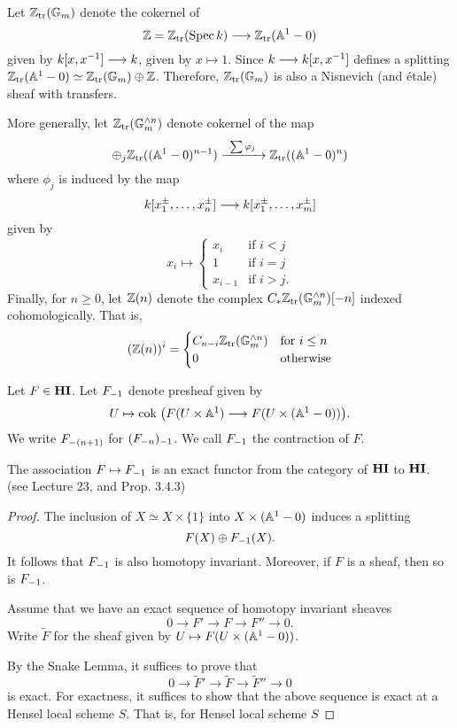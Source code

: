\begin{defn}\label{def_z_n}
Let $\Ztr(\Gm)$ denote the cokernel of
\[
\Z = \Ztr(\Spec \basefield) \to \Ztr(\A^1 - 0)
\]
given by $\basefield [x, x^{-1}] \to \basefield$, given by
$x \mapsto 1$. Since $\basefield \to \basefield[x, x^{-1}]$
defines a splitting $\Ztr(\A^1 - 0) \simeq \Ztr(\Gm) \oplus \Z$.
Therefore, $\Ztr(\Gm)$ is also a Nisnevich (and \'etale) sheaf 
with transfers. 

More generally, let $\Ztr(\Gmn{n})$ denote cokernel of the map 
\[
\oplus_j \Ztr((\A^1 - 0)^{n - 1}) \xrightarrow{\;\;\sum \phi_j\;\;}
\Ztr((\A^1 - 0)^n)
\]
where $\phi_j$ is induced by the map
\[
\basefield[x_1^{\pm},\dots,x_n^{\pm}] \to \basefield[x_1^{\pm},
\dots, x_m^{\pm}]
\]
given by
\[
x_i \mapsto
\begin{cases}
x_i &\textrm{if } i < j \\
1   &\textrm{if } i = j \\
x_{i - 1} &\textrm{if } i > j.
\end{cases}
\]
Finally, for $n \geq 0$, let $\Z(n)$ denote the complex $\suslC 
\Ztr(\Gmn{n})[-n]$ indexed cohomologically. That is, 
\[
(\Z(n))^i = \begin{cases}
\suslC[n - i]\Ztr(\Gmn{n}) & \textrm{for }i \leq n \\
0 & \textrm{otherwise}
\end{cases}
\]
\end{defn}


\begin{defn}
Let $F \in \HI$. Let $\RHI{F}$ denote presheaf given by
\[
U \mapsto \cok\big( F(U \times \A^1) \to 
   F(U \times (\A^1 - 0))\big).
\]
We write $\RHI[(n + 1)]{F}$ for $\RHI{(\RHI[n]{F})}$. We call 
$\RHI{F}$ the contraction of $F$.
\end{defn}

\begin{prop}\label{prop_contract_is_exact}
The association $F \mapsto \RHI{F}$ is an exact functor from
the category of $\HI$ to $\HI$. (see \cite{MVW} Lecture 23, and
\cite{DegGenMot} Prop. 3.4.3)
\end{prop}

\begin{proof}
The inclusion of $X \simeq X \times \{1\}$ into $X \times 
(\A^1 - 0)$ induces a splitting
\[
F(X) \oplus \RHI{F}(X).
\]
It follows that $\RHI{F}$ is also homotopy invariant. Moreover,
if $F$ is a sheaf, then so is $\RHI{F}$.

Assume that we have an exact sequence of homotopy invariant 
sheaves
\[
0 \to F' \to F \to F'' \to 0.
\]
Write $\tilde{F}$ for the sheaf given by $U \mapsto F(U \times 
(\A^1 - 0))$.

By the Snake Lemma, it suffices to prove that
\[
0 \to \tilde{F}' \to \tilde{F} \to \tilde{F}'' \to 0
\]
is exact. For exactness, it suffices to show that the above 
sequence is exact at a Hensel local scheme $S$. That is, for
Hensel local scheme $S$

\end{proof}
